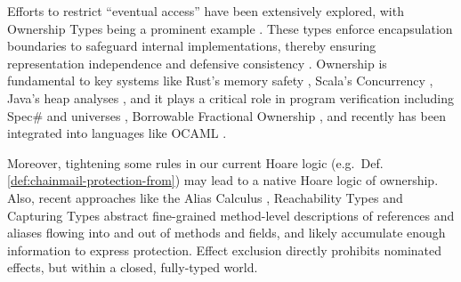    Efforts to restrict ``eventual access'' have been extensively explored, with
 Ownership Types  being a prominent example \cite{simpleOwnership,existOwn}.
These types enforce encapsulation boundaries to safeguard internal implementations, thereby ensuring representation independence and defensive consistency
\cite{ownalias,NobPotVitECOOP98,Banerjee:2005}.
Ownership is fundamental to key systems like Rust’s memory safety  
\cite{RustPL2,RustBelt18},
Scala's Concurrency \cite{ScalaCapabilities,ScalaLightweightAffine},
Java's heap analyses \cite{PotterNC98,HillNP02,MitECOOP06}, 
and it  plays a critical role in program verification
\cite{BoyLisShrPOPL03,hypervisor} including Spec$\#$
\cite{BarLeiSch05,BarDelFahLeiSch04} and universes
\cite{DieDroMue07,DietlMueller05,LuPotPOPL06},
Borrowable Fractional Ownership \cite{borrow-fract-vmcai2024},
and recently has been integrated into languages like OCAML \cite{ocaml-ownership-icfp2024,funk-ownership-oopsla2024}.


Moreover,  tightening some
rules in our current Hoare logic (e.g.\ Def. \ref{def:chainmail-protection-from})
may lead to a native  Hoare logic of ownership.
Also, recent approaches like
%
%
the Alias
Calculus \cite{meyer-alias-calculus-scp2015,meyer-auto-alias-sncs2020},
Reachability
Types \cite{romf-reachability-types-oopsla2021,rompf-poly-reachability-popl2024}
and Capturing
Types \cite{odersky-capturing-types-toplas2023,scoped-effects-oopsla2022,odersky-reach-prog2024}
abstract fine-grained method-level descriptions of 
references and aliases flowing into and out of methods and fields,
and likely accumulate enough information to express 
protection. Effect exclusion
\cite{fx-exclusion-icfp2023} directly prohibits nominated
effects, but within a closed, fully-typed world.



